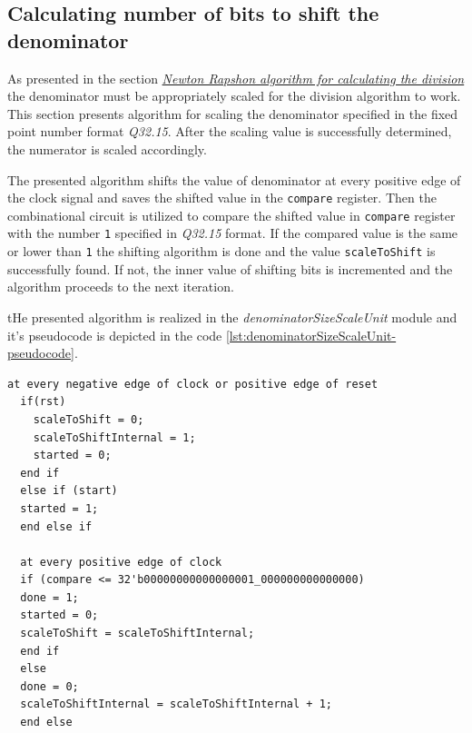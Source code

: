 \documentclass[a4paper, twoside, 11pt]{article}
\begin{document}
\subsection{Calculating number of bits to shift the denominator}\label{subsec:calculating-number-of-bits-to-shift-the-denominator}
As presented in the section \hyperref[subsection:newton-raphson-algorithm-for-calculating-the-division]{\textit{Newton Rapshon algorithm for calculating the division}} the denominator must be appropriately scaled for the division algorithm to work. This section presents algorithm for scaling the denominator specified in the fixed point number format \textit{Q32.15}. After the scaling value is successfully determined, the numerator is scaled accordingly.
\par
The presented algorithm shifts the value of denominator at every positive edge of the clock signal and saves the shifted value in the \texttt{compare} register. Then the combinational circuit is utilized to compare the shifted value in \texttt{compare} register with the number \texttt{1} specified in \textit{Q32.15} format. If the compared value is the same or lower than \texttt{1} the shifting algorithm is done and the value \texttt{scaleToShift} is successfully found. If not, the inner value of shifting bits is incremented and the algorithm proceeds to the next iteration.\par
tHe presented algorithm is realized in the \textit{denominatorSizeScaleUnit} module and it's pseudocode is depicted in the code \ref{lst:denominatorSizeScaleUnit-pseudocode}.

\begin{lstlisting}[language={pseudocode}, caption={Pseudocode for the denominatorSizeScaleUnit module algorithm.}, label= {lst:denominatorSizeScaleUnit-pseudocode}]
  at every negative edge of clock or positive edge of reset
  if(rst)
    scaleToShift = 0;
    scaleToShiftInternal = 1;
    started = 0;
  end if
  else if (start)
  started = 1;
  end else if

  at every positive edge of clock
  if (compare <= 32'b00000000000000001_000000000000000)
  done = 1;
  started = 0;
  scaleToShift = scaleToShiftInternal;
  end if
  else
  done = 0;
  scaleToShiftInternal = scaleToShiftInternal + 1;
  end else
\end{lstlisting}
\end{document}
